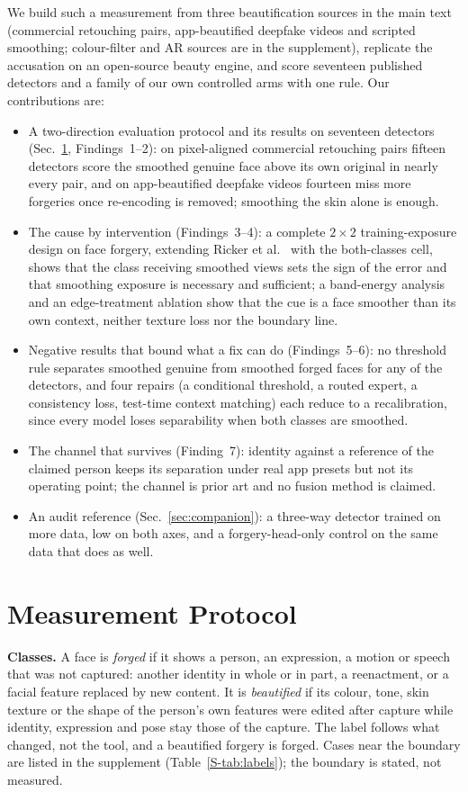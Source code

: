 \documentclass[conference]{IEEEtran}
\begin{document}
We build such a measurement from three beautification sources in the main text (commercial retouching pairs, app-beautified
deepfake videos and scripted smoothing; colour-filter and AR sources are in the supplement), replicate the accusation on an
open-source beauty engine, and score seventeen published detectors and a family of our own controlled arms with one rule. Our contributions are:
\begin{itemize}
\item A two-direction evaluation protocol and its results on seventeen detectors (Sec.~\ref{sec:protocol},
Findings~1--2): on pixel-aligned commercial retouching pairs fifteen detectors score the smoothed genuine face above its
own original in nearly every pair, and on app-beautified deepfake videos fourteen miss more forgeries once re-encoding is
removed; smoothing the skin alone is enough.
\item The cause by intervention (Findings~3--4): a complete $2\times2$ training-exposure design on face forgery, extending
Ricker et al.~\cite{ricker2026biasid} with the both-classes cell, shows that the class receiving smoothed views sets the
sign of the error and that smoothing exposure is necessary and sufficient; a band-energy analysis and an edge-treatment
ablation show that the cue is a face smoother than its own context, neither texture loss nor the boundary line.
\item Negative results that bound what a fix can do (Findings~5--6): no threshold rule separates smoothed genuine from
smoothed forged faces for any of the detectors, and four repairs (a conditional threshold, a routed expert, a consistency
loss, test-time context matching) each reduce to a recalibration, since every model loses separability when both classes
are smoothed.
\item The channel that survives (Finding~7): identity against a reference of the claimed person keeps its separation under
real app presets but not its operating point; the channel is prior art and no fusion method is claimed.
\item An audit reference (Sec.~\ref{sec:companion}): a three-way detector trained on more data, low on both axes, and a
forgery-head-only control on the same data that does as well.
\end{itemize}

\section{Measurement Protocol}
\label{sec:protocol}
\textbf{Classes.} A face is \emph{forged} if it shows a person, an expression, a motion or speech that was not captured:
another identity in whole or in part, a reenactment, or a facial feature replaced by new content. It is \emph{beautified} if
its colour, tone, skin texture or the shape of the person's own features were edited after capture while identity,
expression and pose stay those of the capture. The label follows what changed, not the tool, and a beautified forgery is
forged. Cases near the boundary are listed in the supplement (Table~\ref{S-tab:labels}); the boundary is stated, not
measured.
\end{document}
